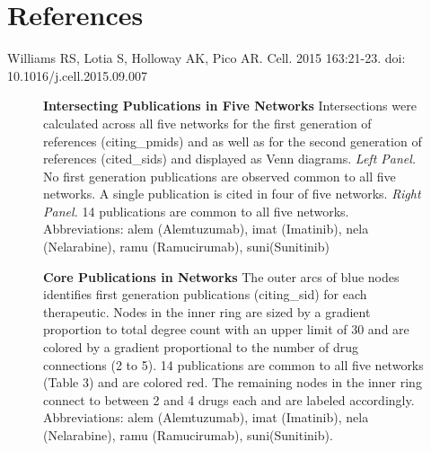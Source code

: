\documentclass[review]{elsarticle}
\begin{document}
\section{References}
 
\begin{thebibliography}{10}
\raggedright

Williams RS, Lotia S, Holloway AK, Pico AR.
\newblock Cell. 2015 163:21-23. doi: 10.1016/j.cell.2015.09.007

\end{thebibliography}

\begin{figure}[!h]
\centering
\scalebox{0.99}
{
\begin{subfigure}{.5\textwidth}
  \centering
  \label{fig:sub1}
\end{subfigure}
\begin{subfigure}{.5\textwidth}
  \centering
  \label{fig:sub2}
\end{subfigure}
}
\caption{{\bf Intersecting Publications in Five Networks} Intersections were calculated across all five networks for the first generation of references (citing\_pmids) and 
as well as for the second generation of references (cited\_sids) and displayed as Venn diagrams. \emph{Left Panel.} No first generation publications are observed common to all five networks. A single publication is cited in four of five networks. \emph{Right Panel.} 14  publications are common to all five networks. Abbreviations: alem (Alemtuzumab), imat (Imatinib), nela (Nelarabine), ramu (Ramucirumab), suni(Sunitinib)}
\label{fig: test}
\end{figure}

\begin{figure}[!h]
\centering
\caption{{\bf Core Publications in Networks}  The outer arcs of blue nodes identifies first generation publications (citing\_sid) for each therapeutic. Nodes in the inner ring are sized by a gradient proportion to total degree count with an upper limit of 30 and are colored by a gradient proportional to the number of drug connections (2 to 5). 14  publications are common to all five networks (Table 3) and are colored red. The remaining nodes in the inner ring connect to between 2 and 4 drugs each and are labeled accordingly. Abbreviations: alem (Alemtuzumab), imat (Imatinib), nela (Nelarabine), ramu (Ramucirumab), suni(Sunitinib).}
\label{fig2}
\end{figure}
\end{document}
